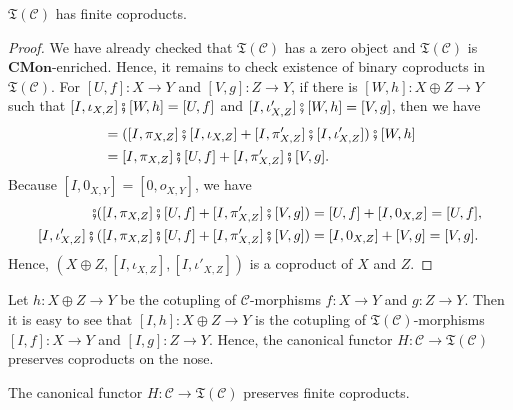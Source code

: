 \begin{theorem}\label{thm:biproduct}
  $\mathfrak{T}(\mathcal{C})$ has finite coproducts.
\end{theorem}
\begin{proof}
  We have already checked that $\mathfrak{T}(\mathcal{C})$
  has a zero object and $\mathfrak{T}(\mathcal{C})$ is
  $\mathbf{CMon}$-enriched. Hence, it remains to check
  existence of binary coproducts in $\mathfrak{T}(\mathcal{C})$.
  For $[U,f] \colon X \to Y$ and $[V,g] \colon Z \to Y$,
  if there is $[W,h] \colon X \oplus Z \to Y$ such that
  $[I,\iota_{X,Z}] \fatsemi [W,h] = [U,f]$ and
  $[I,\iota'_{X,Z}] \fatsemi [W,h] = [V,g]$, then we have
  \begin{align*}
    [W,h]
    &= ([I,\pi_{X,Z}] \fatsemi [I,\iota_{X,Z}] + [I,\pi'_{X,Z}] \fatsemi [I,\iota'_{X,Z}])
      \fatsemi [W,h] \\
    &= [I,\pi_{X,Z}] \fatsemi [U,f] + [I,\pi'_{X,Z}] \fatsemi [V,g].
  \end{align*}
  Because $[I,0_{X,Y}] = [0,o_{X,Y}]$, we have
  \begin{align*}
    [I,\iota_{X,Z}] \fatsemi ([I,\pi_{X,Z}] \fatsemi [U,f] + [I,\pi'_{X,Z}] \fatsemi [V,g])
    &= [U,f] + [I,0_{X,Z}] = [U,f], \\
    [I,\iota'_{X,Z}] \fatsemi ([I,\pi_{X,Z}] \fatsemi [U,f] + [I,\pi'_{X,Z}] \fatsemi [V,g])
    &= [I,0_{X,Z}] + [V,g] = [V,g].
  \end{align*}
  Hence, $(X \oplus Z,[I,\iota_{X,Z}],[I,\iota'_{X,Z}])$ is a
  coproduct of $X$ and $Z$.
\end{proof}

Let $h \colon X \oplus Z \to Y$ be the cotupling of
$\mathcal{C}$-morphisms $f \colon X \to Y$ and
$g \colon Z \to Y$. Then it is easy to see that
$[I,h] \colon X \oplus Z \to Y$ is the cotupling of
$\mathfrak{T}(\mathcal{C})$-morphisms $[I,f] \colon X \to Y$ and
$[I,g] \colon Z \to Y$. Hence, the canonical functor
$H \colon \mathcal{C} \to \mathfrak{T}(\mathcal{C})$ preserves
coproducts on the nose.

\begin{corollary}[Hasegawa]
  The canonical functor $H \colon \mathcal{C} \to \mathfrak{T}(\mathcal{C})$
  preserves finite coproducts.
\end{corollary}

